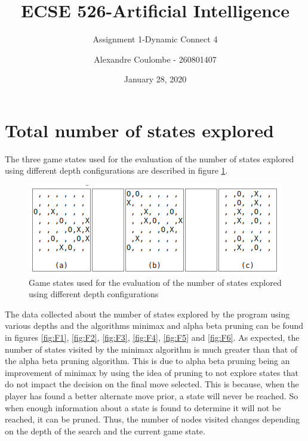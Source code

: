 \documentclass[11pt]{scrartcl}
\begin{document}
\title{ECSE 526-Artificial Intelligence}
\subtitle{Assignment 1-Dynamic Connect 4}
\author{Alexandre Coulombe - 260801407}
\date{January 28, 2020}
\maketitle



\section{Total number of states explored}
The three game states used for the evaluation of the number of states explored using different depth configurations are described in figure \ref{fig:F0}.
 
\begin{figure}[h]
\centering
\includegraphics[scale=0.5]{Figure_0.png}
\caption{Game states used for the evaluation of the number of states explored using different depth configurations}
\label{fig:F0}
\end{figure}

The data collected about the number of states explored by the program using various depths and the algorithms minimax and alpha beta pruning can be found in figures \ref{fig:F1}, \ref{fig:F2}, \ref{fig:F3}, \ref{fig:F4}, \ref{fig:F5} and \ref{fig:F6}. As expected, the number of states visited by the minimax algorithm is much greater than that of the alpha beta pruning algorithm. This is due to alpha beta pruning being an improvement of minimax by using the idea of pruning to not explore states that do not impact the decision on the final move selected. This is because, when the player has found a better alternate move prior, a state will never be reached. So when enough information about a state is found to determine it will not be reached, it can be pruned. Thus, the number of nodes visited changes depending on the depth of the search and the current game state.
\end{document}
